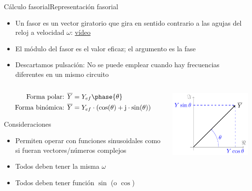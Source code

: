 \documentclass[aspectratio=169, xcolor={usenames,svgnames,dvipsnames}]{beamer}
\begin{document}
\begin{frame}{Cálculo fasorial}{Representación fasorial}
\begin{itemize}
\item Un fasor es un \alert{vector giratorio} que gira en sentido contrario a las agujas del reloj a velocidad $\omega$: \href{https://www.youtube.com/watch?v=9U8_XfBtFrY&ab_channel=Ponuningenieroentuvida}{vídeo}
\item El \alert{módulo} del fasor es el \alert{valor eficaz}; el \alert{argumento} es la \alert{fase}
\item Descartamos pulsación: No se puede emplear cuando hay frecuencias diferentes en un mismo circuito
\end{itemize}

\begin{columns}
\begin{column}{0.65\columnwidth}
\begin{align*}
\text{Forma polar: }& \overline{Y} = Y_{ef}\phase{\theta}\\
\text{Forma binómica: }& \overline{Y} = Y_{ef}\cdot(\cos(\theta)+\mathrm{j}\cdot\sin(\theta))
\end{align*}

\begin{block}{Consideraciones}
 \begin{itemize}
     \item Permiten operar con funciones sinusoidales como si fueran vectores/números complejos
     \item Todos deben tener la misma $\omega$
     \item Todos deben tener función $\sin$ (o $\cos$)
 \end{itemize}
\end{block}
\end{column}

\begin{column}{0.35\columnwidth}
\begin{center}
\includegraphics[height=0.45\textheight]{../figs/fasor.pdf}
\end{center}
\end{column}
\end{columns}
\end{frame}
\end{document}
